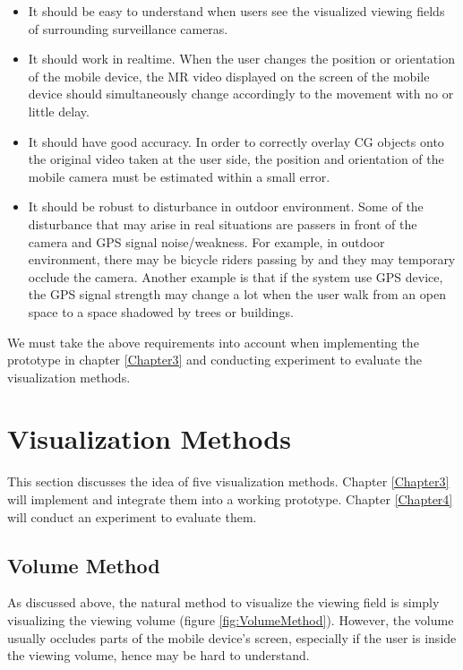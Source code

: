 \begin{itemize}
	\item It should be easy to understand when users see the visualized viewing fields of surrounding surveillance cameras.
	\item It should work in realtime. When the user changes the position or orientation of the mobile device, the MR video displayed on the screen of the mobile device should simultaneously change accordingly to the movement with no or little delay.
	\item It should have good accuracy. In order to correctly overlay CG objects onto the original video taken at the user side, the position and orientation of the mobile camera must be estimated within a small error.
	\item It should be robust to disturbance in outdoor environment. Some of the disturbance that may arise in real situations are passers in front of the camera and GPS signal noise/weakness. For example, in outdoor environment, there may be bicycle riders passing by and they may temporary occlude the camera. Another example is that if the system use GPS device, the GPS signal strength may change a lot when the user walk from an open space to a space shadowed by trees or buildings.
\end{itemize}

We must take the above requirements into account when implementing the prototype in chapter \ref{Chapter3} and conducting experiment to evaluate the visualization methods.


\section{Visualization Methods}
\label{VisualizationMethods}

This section discusses the idea of five visualization methods. Chapter \ref{Chapter3} will implement and integrate them into a working prototype. Chapter \ref{Chapter4} will conduct an experiment to evaluate them.

\subsection{Volume Method}

As discussed above, the natural method to visualize the viewing field is simply visualizing the viewing volume (figure \ref{fig:VolumeMethod}). However, the volume usually occludes parts of the mobile device's screen, especially if the user is inside the viewing volume, hence may be hard to understand.

